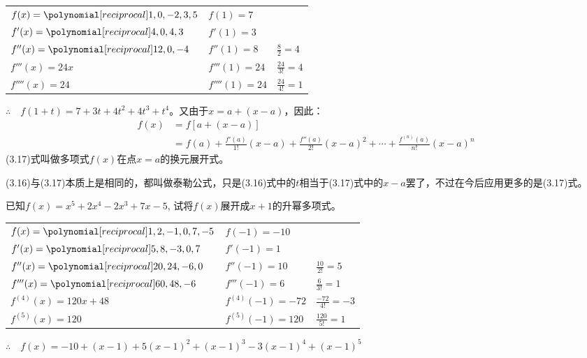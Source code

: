     \begin{solution}
\begin{center}
\begin{tabular}{lll}
$f(x)=\poly{1,0,-2,3,5}$  &  $f(1)=7$  \\
$f'(x)=\poly{4,0,4,3}$  &  $f'(1)=3$  \\
$f''(x)=\poly{12,0,-4}$  &  $f''(1)=8$& $\frac{8}{2}=4$  \\
$f'''(x)=24x$  &  $f'''(1)=24$ & $\frac{24}{3!}=4$\\
$f''''(x)=24$  &  $f''''(1)=24$ & $\frac{24}{4!}=1$\\
\end{tabular}    
\end{center}

$\therefore\quad f(1+t)=7+3t+4t^2+4t^3+t^4$。又由于$x=a+(x-a)$，因此：
\begin{equation}
    \begin{split}
    f(x)&=f[a+(x-a)]\\
    &=f(a)+\frac{f'(a)}{1!}(x-a)+\frac{f''(a)}{2!}(x-a)^2+\cdots+\frac{f^{(n)}(a)}{n!}(x-a)^n
\end{split}
\end{equation}
(3.17)式叫做多项式$f(x)$在点$x=a$的换元展开式。
    \end{solution}

(3.16)与(3.17)本质上是相同的，都叫做泰勒公式，只是(3.16)式中的$t$相当于(3.17)式中的$x-a$罢了，不过在今后应用更多的是(3.17)式。

 \begin{example}
    已知$f(x)=x^5+2x^4-2x^3+7x-5$, 试将$f(x)$展开成$x+1$的升幂多项式。
    \end{example}

    \begin{solution}    
\begin{center}
\begin{tabular}{lll}
$f(x)=\poly{1,2,-1,0,7,-5}$  &  $f(-1)=-10$  \\
$f'(x)=\poly{5,8,-3,0,7}$  &  $f'(-1)=1$  \\
$f''(x)=\poly{20,24,-6,0}$  &  $f''(-1)=10$& $\frac{10}{2!}=5$  \\
$f'''(x)=\poly{60,48,-6}$  &  $f'''(-1)=6$ & $\frac{6}{3!}=1$\\
$f^{(4)}(x)=120x+48$  &  $f^{(4)}(-1)=-72$ & $\frac{-72}{4!}=-3$\\
$f^{(5)}(x)=120$  &  $f^{(5)}(-1)=120$ & $\frac{120}{5!}=1$\\
\end{tabular}    
\end{center}
          
$\therefore\quad f(x)=-10+(x-1)+5(x-1)^2+(x-1)^3-3(x-1)^4+(x-1)^5$
    \end{solution}

